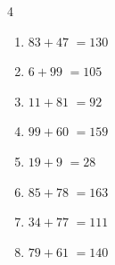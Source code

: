 \begin{multicols}{4}
\begin{enumerate}
  \item $83+47$
        $=130$

  \item $6+99$
        $=105$

  \item $11+81$
        $=92$

  \item $99+60$
        $=159$

  \item $19+9$
        $=28$

  \item $85+78$
        $=163$

  \item $34+77$
        $=111$

  \item $79+61$
        $=140$

\end{enumerate}
\end{multicols}
